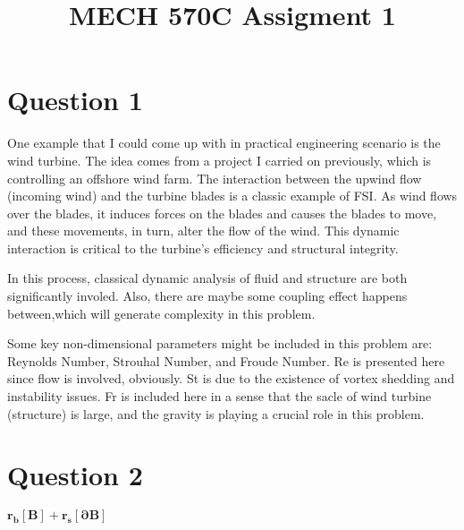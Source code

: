 \documentclass[a4paper,12pt]{article} %
\begin{document}
\setlength{\parskip}{1em} 
\setlength{\parindent}{0pt}
\newcommand{\vect}[1]{\mathbf{#1}}

\title{MECH 570C Assigment 1}

\section{\textbf{Question 1}}


One example that I could come up with in practical engineering scenario is the wind turbine. The idea comes from a project I carried on previously,  which is controlling an offshore wind farm. The interaction between the upwind flow (incoming wind) and the turbine blades is a classic example of FSI. As wind flows over the blades, it induces forces on the blades and  causes the blades to move, and these movements, in turn, alter the flow of the wind. This dynamic interaction is critical to the turbine's efficiency and structural integrity.

In this process, classical dynamic analysis of fluid and structure are both significantly involed. Also, there are maybe some coupling effect happens between,which will generate complexity in this problem.

Some key non-dimensional parameters might be included in this problem are: Reynolds Number, Strouhal Number, and Froude Number. Re is presented here since flow is involved, obviously. St is due to the existence of vortex shedding and instability issues. Fr is included here in a sense that the sacle of wind turbine (structure) is large, and the gravity is playing a crucial role in this problem.


\newpage

\section{\textbf{Question 2}}
$\vect{r_b[B]}+\vect{r_s[\partial B]}$
\end{document}
